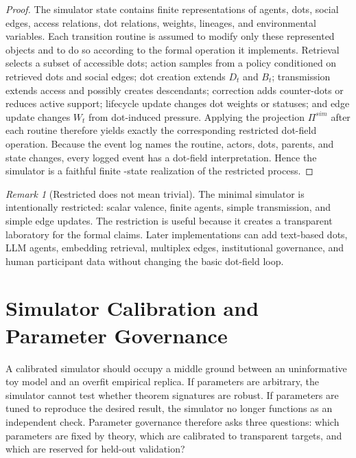 \documentclass[11pt]{article}
\theoremstyle{remark}
\newtheorem{remark}{Remark}
\begin{document}
\begin{proof}
The simulator state contains finite representations of agents, dots,
social edges, access relations, dot relations, weights, lineages, and
environmental variables. Each transition routine is assumed to modify
only these represented objects and to do so according to the formal
operation it implements. Retrieval selects a subset of accessible dots;
action samples from a policy conditioned on retrieved dots and social
edges; dot creation extends $D_t$ and $B_t$; transmission extends access
and possibly creates descendants; correction adds counter-dots or reduces
active support; lifecycle update changes dot weights or statuses; and
edge update changes $W_t$ from dot-induced pressure. Applying the
projection $\Pi^{sim}$ after each routine therefore yields exactly the
corresponding restricted dot-field operation. Because the event log names
the routine, actors, dots, parents, and state changes, every logged event
has a dot-field interpretation. Hence the simulator is a faithful finite
-state realization of the restricted process.
\end{proof}

\begin{remark}[Restricted does not mean trivial]
The minimal simulator is intentionally restricted: scalar valence,
finite agents, simple transmission, and simple edge updates. The
restriction is useful because it creates a transparent laboratory for the
formal claims. Later implementations can add text-based dots, LLM agents,
embedding retrieval, multiplex edges, institutional governance, and human
participant data without changing the basic dot-field loop.
\end{remark}


\section{Simulator Calibration and Parameter Governance}\label{simulator-calibration-parameter-governance}

A calibrated simulator should occupy a middle ground between an uninformative toy model and an overfit empirical replica. If parameters are arbitrary, the simulator cannot test whether theorem signatures are robust. If parameters are tuned to reproduce the desired result, the simulator no longer functions as an independent check. Parameter governance therefore asks three questions: which parameters are fixed by theory, which are calibrated to transparent targets, and which are reserved for held-out validation?
\end{document}
